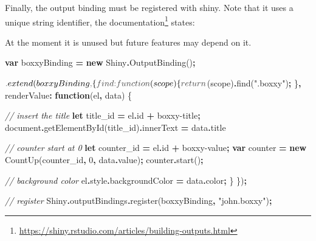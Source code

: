 \documentclass[
]{krantz}
\makeatletter
\newenvironment{Shaded}{\begin{snugshade}}{\end{snugshade}}
\newcommand{\AttributeTok}[1]{\textcolor[rgb]{0.61,0.61,0.61}{#1}}
\newcommand{\BuiltInTok}[1]{#1}
\newcommand{\CommentTok}[1]{\textcolor[rgb]{0.37,0.37,0.37}{\textit{#1}}}
\newcommand{\ControlFlowTok}[1]{\textcolor[rgb]{0.27,0.27,0.27}{\textbf{#1}}}
\newcommand{\DataTypeTok}[1]{\textcolor[rgb]{0.27,0.27,0.27}{#1}}
\newcommand{\DecValTok}[1]{\textcolor[rgb]{0.06,0.06,0.06}{#1}}
\newcommand{\FunctionTok}[1]{\textcolor[rgb]{0,0,0}{#1}}
\newcommand{\KeywordTok}[1]{\textcolor[rgb]{0.27,0.27,0.27}{\textbf{#1}}}
\newcommand{\NormalTok}[1]{#1}
\newcommand{\OperatorTok}[1]{\textcolor[rgb]{0.43,0.43,0.43}{\textbf{#1}}}
\newcommand{\StringTok}[1]{\textcolor[rgb]{0.5,0.5,0.5}{#1}}
\renewenvironment{quote}{\begin{VF}}{\end{VF}}
\renewcommand{\href}[2]{#2\footnote{\url{#1}}}
\newenvironment{kframe}{%
\medskip{}
\setlength{\fboxsep}{.8em}
 \def\at@end@of@kframe{}%
 \ifinner\ifhmode%
  \def\at@end@of@kframe{\end{minipage}}%
  \begin{minipage}{\columnwidth}%
 \fi\fi%
 \def\FrameCommand##1{\hskip\@totalleftmargin \hskip-\fboxsep
 \colorbox{shadecolor}{##1}\hskip-\fboxsep
     \hskip-\linewidth \hskip-\@totalleftmargin \hskip\columnwidth}%
 \MakeFramed {\advance\hsize-\width
   \@totalleftmargin\z@ \linewidth\hsize
   \@setminipage}}%
 {\par\unskip\endMakeFramed%
 \at@end@of@kframe}
\renewenvironment{Shaded}{\begin{kframe}}{\end{kframe}}
\makeatother
\begin{document}
Finally, the output binding must be registered with shiny. Note that it uses a unique string identifier, the \href{https://shiny.rstudio.com/articles/building-outputs.html}{documentation} states:

\begin{quote}
At the moment it is unused but future features may depend on it.
\end{quote}

\begin{Shaded}
\begin{Highlighting}[]
\KeywordTok{var}\NormalTok{ boxxyBinding }\OperatorTok{=} \KeywordTok{new}\NormalTok{ Shiny}\OperatorTok{.}\FunctionTok{OutputBinding}\NormalTok{()}\OperatorTok{;}

\NormalTok{$}\OperatorTok{.}\FunctionTok{extend}\NormalTok{(boxxyBinding}\OperatorTok{,}\NormalTok{ \{}
  \DataTypeTok{find}\OperatorTok{:} \KeywordTok{function}\NormalTok{(scope) \{}
    \ControlFlowTok{return}\NormalTok{ $(scope)}\OperatorTok{.}\FunctionTok{find}\NormalTok{(}\StringTok{".boxxy"}\NormalTok{)}\OperatorTok{;}
\NormalTok{  \}}\OperatorTok{,}
  \DataTypeTok{renderValue}\OperatorTok{:} \KeywordTok{function}\NormalTok{(el}\OperatorTok{,}\NormalTok{ data) \{}

    \CommentTok{// insert the title}
    \KeywordTok{let}\NormalTok{ title\_id }\OperatorTok{=}\NormalTok{ el}\OperatorTok{.}\AttributeTok{id} \OperatorTok{+} \StringTok{\textquotesingle{}{-}boxxy{-}title\textquotesingle{}}\OperatorTok{;}
    \BuiltInTok{document}\OperatorTok{.}\FunctionTok{getElementById}\NormalTok{(title\_id)}\OperatorTok{.}\AttributeTok{innerText} \OperatorTok{=}\NormalTok{ data}\OperatorTok{.}\AttributeTok{title}

    \CommentTok{// counter start at 0}
    \KeywordTok{let}\NormalTok{ counter\_id }\OperatorTok{=}\NormalTok{ el}\OperatorTok{.}\AttributeTok{id} \OperatorTok{+} \StringTok{\textquotesingle{}{-}boxxy{-}value\textquotesingle{}}\OperatorTok{;}
    \KeywordTok{var}\NormalTok{ counter }\OperatorTok{=} \KeywordTok{new}\NormalTok{ CountUp(counter\_id}\OperatorTok{,} \DecValTok{0}\OperatorTok{,}\NormalTok{ data}\OperatorTok{.}\AttributeTok{value}\NormalTok{)}\OperatorTok{;}
\NormalTok{    counter}\OperatorTok{.}\FunctionTok{start}\NormalTok{()}\OperatorTok{;}

    \CommentTok{// background color }
\NormalTok{    el}\OperatorTok{.}\AttributeTok{style}\OperatorTok{.}\AttributeTok{backgroundColor} \OperatorTok{=}\NormalTok{ data}\OperatorTok{.}\AttributeTok{color}\OperatorTok{;}
\NormalTok{  \}}
\NormalTok{\})}\OperatorTok{;}

\CommentTok{// register}
\NormalTok{Shiny}\OperatorTok{.}\AttributeTok{outputBindings}\OperatorTok{.}\FunctionTok{register}\NormalTok{(boxxyBinding}\OperatorTok{,} \StringTok{"john.boxxy"}\NormalTok{)}\OperatorTok{;}
\end{Highlighting}
\end{Shaded}
\end{document}
